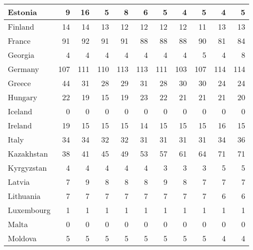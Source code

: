 \begin{table}
\begin{tabular}{|l|r|r|r|r|r|r|r|r|r|r|}
                       Estonia&      9&     16&      5&      8&      6&      5&      4&      5&      4&      5\\\hline
                       Finland&     14&     14&     13&     12&     12&     12&     12&     11&     13&     13\\\hline
                        France&     91&     92&     91&     91&     88&     88&     88&     90&     81&     84\\\hline
                       Georgia&      4&      4&      4&      4&      4&      4&      4&      5&      4&      8\\\hline
                       Germany&    107&    111&    110&    113&    113&    111&    103&    107&    114&    114\\\hline
                        Greece&     44&     31&     28&     29&     31&     28&     30&     30&     24&     24\\\hline
                       Hungary&     22&     19&     15&     19&     23&     22&     21&     21&     21&     20\\\hline
                       Iceland&      0&      0&      0&      0&      0&      0&      0&      0&      0&      0\\\hline
                       Ireland&     19&     15&     15&     15&     14&     15&     15&     15&     16&     15\\\hline
                         Italy&     34&     34&     32&     32&     31&     31&     31&     31&     34&     36\\\hline
                    Kazakhstan&     38&     41&     45&     49&     53&     57&     61&     64&     71&     71\\\hline
                    Kyrgyzstan&      4&      4&      4&      4&      4&      3&      3&      3&      5&      5\\\hline
                        Latvia&      7&      9&      8&      8&      8&      9&      8&      7&      7&      7\\\hline
                     Lithuania&      7&      7&      7&      7&      7&      7&      7&      7&      6&      6\\\hline
                    Luxembourg&      1&      1&      1&      1&      1&      1&      1&      1&      1&      1\\\hline
                         Malta&      0&      0&      0&      0&      0&      0&      0&      0&      0&      0\\\hline
                       Moldova&      5&      5&      5&      5&      5&      5&      5&      5&      4&      4\\\hline

\end{tabular}
\end{table}
